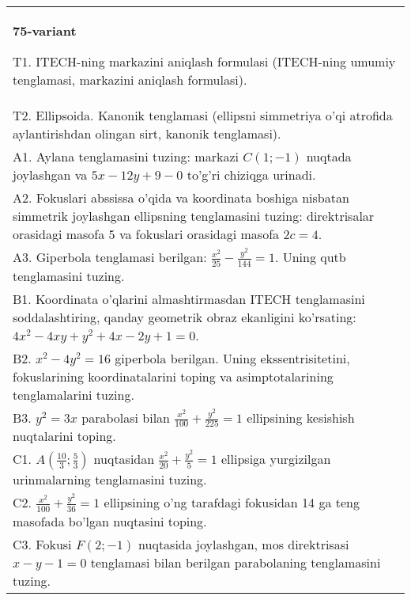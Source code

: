 \documentclass{article}
\begin{document}
\begin{tabular}{m{17cm}}
\textbf{75-variant}
\newline

T1. ITECH-ning markazini aniqlash formulasi (ITECH-ning umumiy tenglamasi, markazini aniqlash formulasi).\\

T2. Ellipsoida. Kanonik tenglamasi (ellipsni simmetriya o'qi atrofida aylantirishdan olingan sirt, kanonik tenglamasi).\\

A1. Aylana tenglamasini tuzing: markazi $C(1;-1)$ nuqtada joylashgan va $5x-12y+9-0$ to'g'ri chiziqga urinadi.\\

A2. Fokuslari abssissa o'qida va koordinata boshiga nisbatan simmetrik joylashgan ellipsning tenglamasini tuzing: direktrisalar orasidagi masofa $5$ va fokuslari orasidagi masofa $2c=4$.\\

A3. Giperbola tenglamasi berilgan: $\frac{x^{2}}{25}-\frac{y^{2}}{144}=1$. Uning qutb tenglamasini tuzing.\\

B1. Koordinata o'qlarini almashtirmasdan ITECH tenglamasini soddalashtiring, qanday geometrik obraz ekanligini ko'rsating: $4x^{2} - 4xy + y^{2} + 4x - 2y + 1 = 0$.  \\

B2. $x^{2} - 4y^{2} = 16$ giperbola berilgan. Uning ekssentrisitetini, fokuslarining koordinatalarini toping va asimptotalarining tenglamalarini tuzing.\\

B3. $y^{2} = 3x$ parabolasi bilan $\frac{x^{2}}{100} + \frac{y^{2}}{225} = 1$ ellipsining kesishish nuqtalarini toping.  \\

C1. $A(\frac{10}{3};\frac{5}{3})$ nuqtasidan $\frac{x^{2}}{20} + \frac{y^{2}}{5} = 1$ ellipsiga yurgizilgan urinmalarning tenglamasini tuzing.  \\

C2. $\frac{x^{2}}{100} + \frac{y^{2}}{36} = 1$ ellipsining o'ng tarafdagi fokusidan 14 ga teng masofada bo'lgan nuqtasini toping.  \\

C3. Fokusi $F(2; - 1)$ nuqtasida joylashgan, mos direktrisasi $x - y - 1 = 0$ tenglamasi bilan berilgan parabolaning tenglamasini tuzing.  \\

\end{tabular}
\vspace{1cm}
\end{document}
